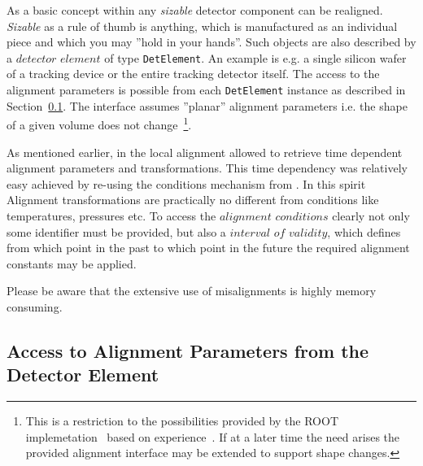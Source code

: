 \documentclass[10pt,a4paper]{article}
\begin{document}
\noindent
As a basic concept within \DDhep any {\it{sizable}} detector component
can be realigned. {\it{Sizable}} as a rule of thumb is anything, which 
is manufactured as an individual piece and which you may ''hold in your hands''.
Such objects are also described by a $detector$ $element$ of type {\tt DetElement}.
An example is e.g. a single silicon wafer of a tracking device or the entire
tracking detector itself.
The access to the alignment parameters is possible from each {\tt DetElement}
instance as described in Section~\ref{sec:ddalign-user-manual-misalignment-access}.
The interface assumes ''planar'' alignment parameters i.e. the shape of 
a given volume does not change~\footnote{This is a restriction to the 
possibilities provided by the ROOT implemetation~\cite{bib:ROOT-tgeo}
based on experience~\cite{bib:chris-parkes-priv-comm}.
If at a later time the need arises the provided alignment interface may 
be extended to support shape changes.}.

\noindent
As mentioned earlier, in the local alignment \DDA allowed to retrieve 
time dependent alignment parameters and transformations. This time
dependency was relatively easy achieved by re-using the conditions 
mechanism from \DDC. In this spirit Alignment transformations are 
practically no different from conditions like temperatures, pressures etc.
To access the $alignment$ $conditions$ clearly not only some 
identifier must be provided, but also a $interval$ $of$ $validity$,
which defines from which point in the past to which point in the future
the required alignment constants may be applied.

\noindent
Please be aware that the extensive use of misalignments is highly memory
consuming.

\noindent
\subsection{Access to Alignment Parameters from the Detector Element}
\label{sec:ddalign-user-manual-misalignment-access}
\end{document}
